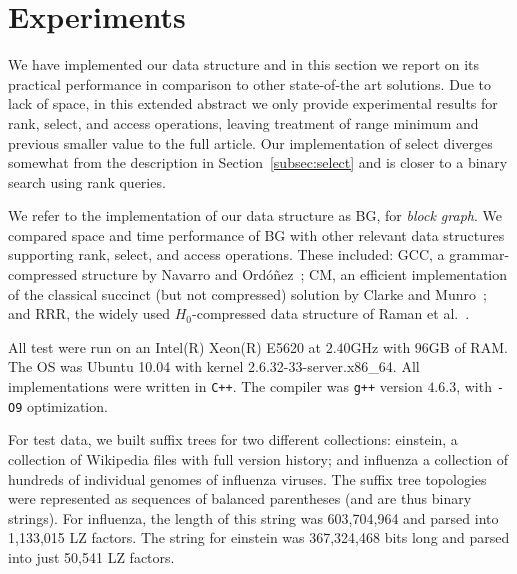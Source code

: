 \documentclass[12pt]{article}
\begin{document}
\section{Experiments}
\label{sec:experiments}

We have implemented our data structure and in this section we report on its
practical performance in comparison to other state-of-the art solutions. Due 
to lack of space, in this extended abstract we only provide experimental results 
for rank, select, and access operations, leaving treatment of range minimum 
and previous smaller value to the full article. Our implementation of select
diverges somewhat from the description in Section~\ref{subsec:select} and is 
closer to a binary search using rank queries.

We refer to the implementation of our data 
structure as BG, for {\em block graph}. We compared space and time performance 
of BG with other relevant data structures supporting rank, select, and access
operations. These included: GCC, a grammar-compressed structure by
Navarro and Ord\'o\~{n}ez~\cite{NO14}; CM, an efficient implementation of the classical 
succinct (but not compressed) solution by Clarke and Munro~\cite{Mun96}; and RRR, the 
widely used $H_0$-compressed data structure of Raman et al.~\cite{RRR07}. 

All test were run on an Intel(R) Xeon(R) E5620 at $2.40$GHz with $96$GB of RAM. 
The OS was Ubuntu 10.04 with kernel 2.6.32-33-server.x86\_64. All implementations 
were written in {\tt C++}. The compiler was \verb|g++| version $4.6.3$, with \verb|-O9| 
optimization.

For test data, we built suffix trees for two different collections: {\sf einstein},
a collection of Wikipedia files with full version history; and {\sf influenza} a 
collection of hundreds of individual genomes of influenza viruses. The suffix tree topologies
were represented as sequences of balanced parentheses (and are thus binary strings). For {\sf influenza}, the 
length of this string was 603,704,964 and parsed into 1,133,015 LZ factors. 
The string for {\sf einstein} was 367,324,468 bits long and parsed into just 50,541
LZ factors.
\end{document}
